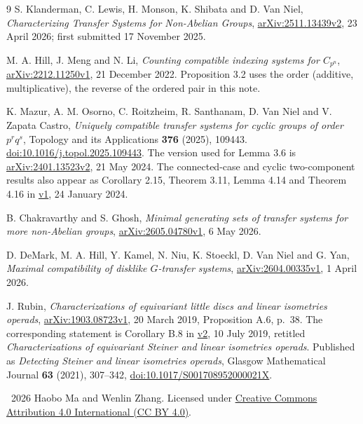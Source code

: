 \documentclass[11pt]{article}
\begin{document}
\begin{thebibliography}{9}
S. Klanderman, C. Lewis, H. Monson, K. Shibata and D. Van Niel,
\emph{Characterizing Transfer Systems for Non-Abelian Groups},
\href{https://arxiv.org/abs/2511.13439v2}{arXiv:2511.13439v2},
23 April 2026; first submitted 17 November 2025.

M. A. Hill, J. Meng and N. Li,
\emph{Counting compatible indexing systems for $C_{p^n}$},
\href{https://arxiv.org/abs/2212.11250v1}{arXiv:2212.11250v1},
21 December 2022. Proposition 3.2 uses the order (additive, multiplicative),
the reverse of the ordered pair in this note.

K. Mazur, A. M. Osorno, C. Roitzheim, R. Santhanam, D. Van Niel and
V. Zapata Castro,
\emph{Uniquely compatible transfer systems for cyclic groups of order
$p^r q^s$}, Topology and its Applications \textbf{376} (2025), 109443.
\href{https://doi.org/10.1016/j.topol.2025.109443}{doi:10.1016/j.topol.2025.109443}.
The version used for Lemma 3.6 is
\href{https://arxiv.org/abs/2401.13523v2}{arXiv:2401.13523v2}, 21 May 2024.
The connected-case and cyclic two-component results also appear as
Corollary 2.15, Theorem 3.11, Lemma 4.14 and Theorem 4.16 in
\href{https://arxiv.org/abs/2401.13523v1}{v1}, 24 January 2024.

B. Chakravarthy and S. Ghosh,
\emph{Minimal generating sets of transfer systems for more non-Abelian groups},
\href{https://arxiv.org/abs/2605.04780v1}{arXiv:2605.04780v1}, 6 May 2026.

D. DeMark, M. A. Hill, Y. Kamel, N. Niu, K. Stoeckl, D. Van Niel and G. Yan,
\emph{Maximal compatibility of disklike $G$-transfer systems},
\href{https://arxiv.org/abs/2604.00335v1}{arXiv:2604.00335v1}, 1 April 2026.

J. Rubin,
\emph{Characterizations of equivariant little discs and linear isometries operads},
\href{https://arxiv.org/abs/1903.08723v1}{arXiv:1903.08723v1}, 20 March 2019,
Proposition A.6, p.~38.
The corresponding statement is Corollary B.8 in
\href{https://arxiv.org/abs/1903.08723v2}{v2}, 10 July 2019,
retitled \emph{Characterizations of equivariant Steiner and linear
isometries operads}.
Published as \emph{Detecting Steiner and linear isometries operads},
Glasgow Mathematical Journal \textbf{63} (2021), 307--342,
\href{https://doi.org/10.1017/S001708952000021X}{doi:10.1017/S001708952000021X}.
\end{thebibliography}

\bigskip\noindent\small
\textcopyright\ 2026 Haobo Ma and Wenlin Zhang.
Licensed under \href{https://creativecommons.org/licenses/by/4.0/}{Creative
Commons Attribution 4.0 International (CC BY 4.0)}.
\end{document}
